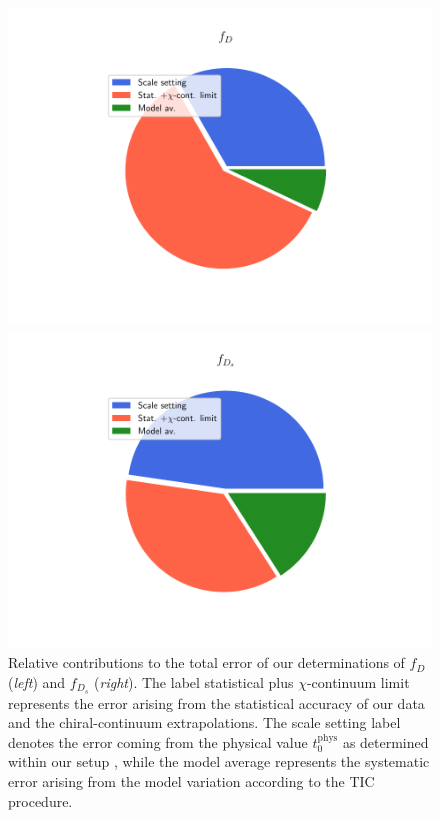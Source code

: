\begin{figure}[t!]
\begin{center}
\begin{minipage}{.40\linewidth}
\includegraphics[width=\linewidth]{././cap6/figs/fds/error_pie_fd.pdf}
\end{minipage}
\hspace{10mm}
\begin{minipage}{.39\linewidth}
\includegraphics[width=\linewidth]{././cap6/figs/fds/error_pie_fds.pdf}
\end{minipage}
\end{center}
\vspace{-5mm}
	\caption{Relative contributions to the total error of our determinations of $f_D$ (\textit{left}) and $f_{D_s}$ (\textit{right}). The label statistical plus $\chi$-continuum limit represents the error arising from the statistical accuracy of our data and the chiral-continuum extrapolations. The scale setting label denotes the error coming from the physical value $t_0^{\mathrm{phys}}$ as determined within our setup \cite{MA1}, while the model average represents the systematic error arising from the model variation according to the TIC procedure.	}
	\label{fig:fds_error_sources}
\end{figure}


